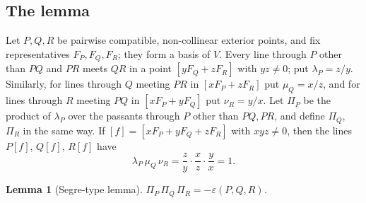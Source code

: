 \documentclass[11pt]{amsart}
\newtheorem{lemma}[theorem]{Lemma}
\theoremstyle{definition}
\theoremstyle{remark}
\numberwithin{equation}{section}
\begin{document}
\subsection{The lemma}
Let $P,Q,R$ be pairwise compatible, non-collinear exterior points, and fix representatives $F_P,F_Q,F_R$; they form a basis of
$V$. Every line through $P$ other than $PQ$ and $PR$ meets $QR$ in a point $[yF_Q+zF_R]$ with $yz\ne0$; put $\lambda_P=z/y$.
Similarly, for lines through $Q$ meeting $PR$ in $[xF_P+zF_R]$ put $\mu_Q=x/z$, and for lines through $R$ meeting $PQ$ in
$[xF_P+yF_Q]$ put $\nu_R=y/x$. Let $\Pi_P$ be the product of $\lambda_P$ over the passants through $P$ other than $PQ,PR$, and
define $\Pi_Q$, $\Pi_R$ in the same way. If $[f]=[xF_P+yF_Q+zF_R]$ with $xyz\ne0$, then the lines $P[f]$, $Q[f]$, $R[f]$ have
\begin{equation}\label{eq:ceva}
\lambda_P\,\mu_Q\,\nu_R=\frac zy\cdot\frac xz\cdot\frac yx=1 .
\end{equation}

\begin{lemma}[Segre-type lemma]\label{lem:segre}
$\Pi_P\,\Pi_Q\,\Pi_R=-\varepsilon(P,Q,R)$.
\end{lemma}
\end{document}
